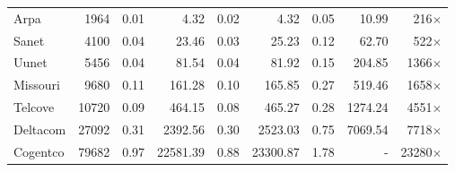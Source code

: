 \begin{tabular}{|l|r|rr|rr|rr|r|}
Arpa & 1964 & 0.01 & 4.32 & 0.02 & 4.32 & 0.05 & 10.99 & 216$\times$\\
Sanet & 4100 & 0.04 & 23.46 & 0.03 & 25.23 & 0.12 & 62.70 & 522$\times$\\
Uunet & 5456 & 0.04 & 81.54 & 0.04 & 81.92 & 0.15 & 204.85 & 1366$\times$\\
Missouri & 9680 & 0.11 & 161.28 & 0.10 & 165.85 & 0.27 & 519.46 & 1658$\times$\\
Telcove & 10720 & 0.09 & 464.15 & 0.08 & 465.27 & 0.28 & 1274.24 & 4551$\times$\\
Deltacom & 27092 & 0.31 & 2392.56 & 0.30 & 2523.03 & 0.75 & 7069.54 & 7718$\times$\\
Cogentco & 79682 & 0.97 & 22581.39 & 0.88 & 23300.87 & 1.78 & - & 23280$\times$\\

\end{tabular}
